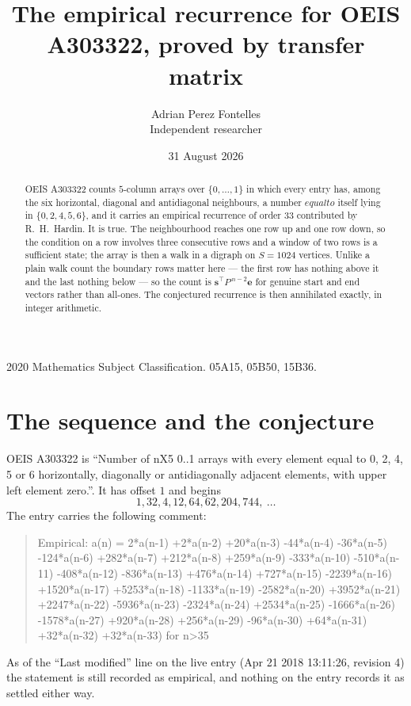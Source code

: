 \documentclass[11pt,a4paper]{article}
\title{The empirical recurrence for OEIS A303322, proved by transfer matrix}
\author{Adrian Perez Fontelles\\ \small Independent researcher}
\date{31 August 2026}
\theoremstyle{plain}
\theoremstyle{definition}
\begin{document}
\maketitle

\begin{abstract}
OEIS A303322 counts $5$-column arrays over $\{0,\dots,1\}$ in which every entry has,
among the six horizontal, diagonal and antidiagonal neighbours, a number $equal to$ itself lying in $\{0,2,4,5,6\}$, and it carries an empirical
recurrence of order $33$ contributed by R.~H.~Hardin. It is true. The neighbourhood
reaches one row up and one row down, so the condition on a row involves three consecutive
rows and a window of two rows is a sufficient state; the array is then a walk in a digraph
on $S=1024$ vertices. Unlike a plain walk count the boundary rows matter here --- the first
row has nothing above it and the last nothing below --- so the count is
$\mathbf{s}^{\!\top}P^{\,n-2}\mathbf{e}$ for genuine start and end vectors rather than
all-ones. The conjectured recurrence is then annihilated exactly, in integer arithmetic.
\end{abstract}

\noindent\small 2020 Mathematics Subject Classification. 05A15, 05B50, 15B36.\normalsize

\section{The sequence and the conjecture}

OEIS A303322 is ``Number of nX5 0..1 arrays with every element equal to 0, 2, 4, 5 or 6 horizontally, diagonally or antidiagonally adjacent elements, with upper left element zero.''. It has offset
$1$ and begins
\[
1, 32, 4, 12, 64, 62, 204, 744,\ \dots
\]
The entry carries the following comment:
\begin{quote}\small
Empirical: a(n) = 2*a(n-1) +2*a(n-2) +20*a(n-3) -44*a(n-4) -36*a(n-5) -124*a(n-6) +282*a(n-7) +212*a(n-8) +259*a(n-9) -333*a(n-10) -510*a(n-11) -408*a(n-12) -836*a(n-13) +476*a(n-14) +727*a(n-15) -2239*a(n-16) +1520*a(n-17) +5253*a(n-18) -1133*a(n-19) -2582*a(n-20) +3952*a(n-21) +2247*a(n-22) -5936*a(n-23) -2324*a(n-24) +2534*a(n-25) -1666*a(n-26) -1578*a(n-27) +920*a(n-28) +256*a(n-29) -96*a(n-30) +64*a(n-31) +32*a(n-32) +32*a(n-33) for n>35
\end{quote}
As of the ``Last modified'' line on the live entry (Apr 21 2018 13:11:26, revision
4) the statement is still recorded as empirical, and nothing on the entry
records it as settled either way.
\end{document}
